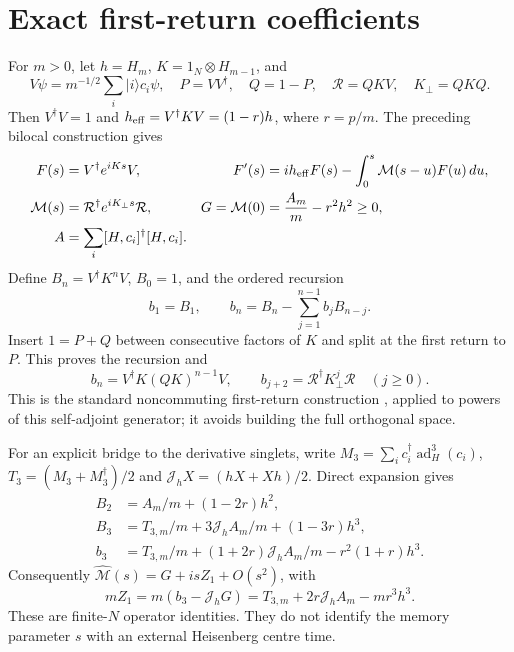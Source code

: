\documentclass[11pt,a4paper]{article}
\newcommand{\mcM}{\mathcal M}
\newcommand{\mcR}{\mathcal R}
\newcommand{\Jh}{\mathcal J_h}
\begin{document}
\section{Exact first-return coefficients}
For $m>0$, let $h=H_m$, $K=1_N\otimes H_{m-1}$, and
\begin{equation}
 V\psi=m^{-1/2}\sum_i|i\rangle c_i\psi,\quad
 P=VV^\dagger,\quad Q=1-P,\quad
 \mcR=QKV,\quad K_\perp=QKQ .
\end{equation}
Then $V^\dagger V=1$ and $h_{\rm eff}=V^\dagger KV=(1-r)h$,
where $r=p/m$. The preceding bilocal construction gives
\begin{align}
 F(s)&=V^\dagger e^{iKs}V,&
 F'(s)&=ih_{\rm eff}F(s)-\int_0^s\mcM(s-u)F(u)\,du,\\
 \mcM(s)&=\mcR^\dagger e^{iK_\perp s}\mcR,&
 G=\mcM(0)&=\frac{A_m}{m}-r^2h^2\geq0,\label{eq:G}\\
 A&=\sum_i[H,c_i]^\dagger[H,c_i].\nonumber
\end{align}
Define $B_n=V^\dagger K^nV$, $B_0=1$, and the ordered recursion
\begin{equation}\label{eq:renewal}
 b_1=B_1,\qquad b_n=B_n-\sum_{j=1}^{n-1}b_jB_{n-j}.
\end{equation}
Insert $1=P+Q$ between consecutive factors of $K$ and split at the
first return to $P$. This proves the recursion and
\begin{equation}
 b_n=V^\dagger K(QK)^{n-1}V,\qquad
 b_{j+2}=\mcR^\dagger K_\perp^j\mcR\quad(j\geq0).
\end{equation}
This is the standard noncommuting first-return construction
\cite{renewal}, applied to powers of this self-adjoint generator;
it avoids building the full orthogonal space.

For an explicit bridge to the derivative singlets, write
$M_3=\sum_i c_i^\dagger\operatorname{ad}_H^3(c_i)$,
$T_3=(M_3+M_3^\dagger)/2$ and $\Jh X=(hX+Xh)/2$. Direct expansion gives
\begin{align}
 B_2&=A_m/m+(1-2r)h^2,\\
 B_3&=T_{3,m}/m+3\Jh A_m/m+(1-3r)h^3,\\
 b_3&=T_{3,m}/m+(1+2r)\Jh A_m/m-r^2(1+r)h^3.
\end{align}
Consequently $\widehat{\mcM}(s)=G+isZ_1+O(s^2)$, with
\begin{equation}\label{eq:Z}
 mZ_1=m(b_3-\Jh G)=T_{3,m}+2r\Jh A_m-mr^3h^3.
\end{equation}
These are finite-$N$ operator identities. They do not identify the
memory parameter $s$ with an external Heisenberg centre time.
\end{document}
